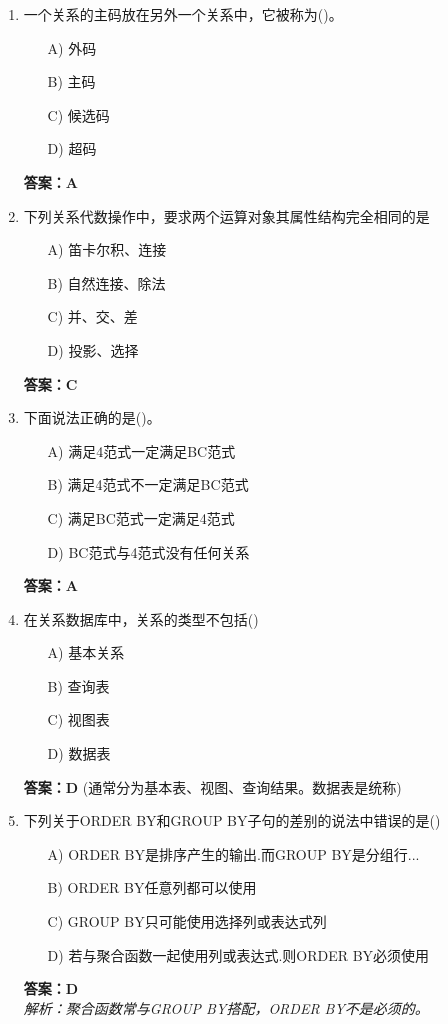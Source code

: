 \documentclass[a4paper,12pt]{article}
\begin{document}
\begin{enumerate}[label=\arabic*.]
\item 一个关系的主码放在另外一个关系中，它被称为()。
\begin{itemize}
    \item[A)] 外码
    \item[B)] 主码
    \item[C)] 候选码
    \item[D)] 超码
\end{itemize}
\textbf{答案：A}

\item 下列关系代数操作中，要求两个运算对象其属性结构完全相同的是
\begin{itemize}
    \item[A)] 笛卡尔积、连接
    \item[B)] 自然连接、除法
    \item[C)] 并、交、差
    \item[D)] 投影、选择
\end{itemize}
\textbf{答案：C}

\item 下面说法正确的是()。
\begin{itemize}
    \item[A)] 满足4范式一定满足BC范式
    \item[B)] 满足4范式不一定满足BC范式
    \item[C)] 满足BC范式一定满足4范式
    \item[D)] BC范式与4范式没有任何关系
\end{itemize}
\textbf{答案：A}

\item 在关系数据库中，关系的类型不包括()
\begin{itemize}
    \item[A)] 基本关系
    \item[B)] 查询表
    \item[C)] 视图表
    \item[D)] 数据表
\end{itemize}
\textbf{答案：D} (通常分为基本表、视图、查询结果。数据表是统称)

\item 下列关于ORDER BY和GROUP BY子句的差别的说法中错误的是()
\begin{itemize}
    \item[A)] ORDER BY是排序产生的输出.而GROUP BY是分组行...
    \item[B)] ORDER BY任意列都可以使用
    \item[C)] GROUP BY只可能使用选择列或表达式列
    \item[D)] 若与聚合函数一起使用列或表达式.则ORDER BY必须使用
\end{itemize}
\textbf{答案：D} \\
\textit{解析：聚合函数常与GROUP BY搭配，ORDER BY不是必须的。}


\end{enumerate}
\end{document}
